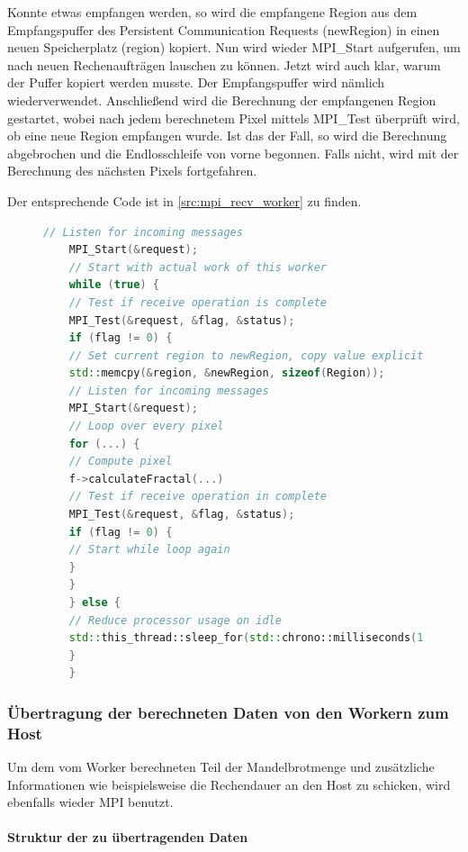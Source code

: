 Konnte etwas empfangen werden, so wird die empfangene Region aus dem Empfangspuffer des Persistent Communication Requests (newRegion) in einen neuen Speicherplatz (region) kopiert. Nun wird wieder MPI\_Start aufgerufen, um nach neuen Rechenaufträgen lauschen zu können. Jetzt wird auch klar, warum der Puffer kopiert werden musste. Der Empfangspuffer wird nämlich wiederverwendet. Anschließend wird die Berechnung der empfangenen Region gestartet, wobei nach jedem berechnetem Pixel mittels MPI\_Test überprüft wird, ob eine neue Region empfangen wurde. Ist das der Fall, so wird die Berechnung abgebrochen und die Endlosschleife von vorne begonnen. Falls nicht, wird mit der Berechnung des nächsten Pixels fortgefahren.

Der entsprechende Code ist in \autoref{src:mpi_recv_worker} zu finden.

\begin{figure}[h!]
	\begin{lstlisting}[language=c++, caption={Empfangen neuer Rechenaufträge im Worker}, label={src:mpi_recv_worker}, firstnumber=59]
	// Listen for incoming messages
	MPI_Start(&request);
	// Start with actual work of this worker
	while (true) {
	// Test if receive operation is complete
	MPI_Test(&request, &flag, &status);
	if (flag != 0) {
	// Set current region to newRegion, copy value explicitly
	std::memcpy(&region, &newRegion, sizeof(Region));
	// Listen for incoming messages
	MPI_Start(&request);
	// Loop over every pixel
	for (...) {
	// Compute pixel
	f->calculateFractal(...)
	// Test if receive operation in complete
	MPI_Test(&request, &flag, &status);
	if (flag != 0) {
	// Start while loop again
	}
	}
	} else {
	// Reduce processor usage on idle
	std::this_thread::sleep_for(std::chrono::milliseconds(1));
	}
	}
	\end{lstlisting}
\end{figure}

\subsubsection{Übertragung der berechneten Daten von den Workern zum Host}

Um dem vom Worker berechneten Teil der Mandelbrotmenge und zusätzliche Informationen wie beispielsweise die Rechendauer an den Host zu schicken, wird ebenfalls wieder MPI benutzt.

\paragraph{Struktur der zu übertragenden Daten}\label{para:struktur_daten}

